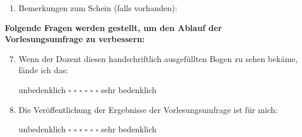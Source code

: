 \documentclass[10pt,a4paper]{article}
\begin{document}
\begin{enumerate}
	\underline{\hspace{15.9cm}}
	
	\underline{\hspace{15.9cm}}
	\vspace{0.1pt}
	
	\item Bemerkungen zum Schein (falls vorhanden):
	
	\underline{\hspace{15.9cm}}
	
	\underline{\hspace{15.9cm}}
	
	\underline{\hspace{15.9cm}}
	
\end{enumerate}

\textbf{Folgende Fragen werden gestellt, um den Ablauf der Vorlesungsumfrage zu verbessern:}
	\begin{enumerate}
		\setcounter{enumi}{6}
		\item Wenn der Dozent diesen handschriftlich ausgefüllten Bogen zu sehen bekäme, fände ich das:
		\vspace{-1pt}
		\begin{center}
			unbedenklich \hspace{0.2cm} $\square$ \hspace{1cm} $\square$ \hspace{1cm} $\square$ \hspace{1cm} $\square$ \hspace{1cm} $\square$ \hspace{1cm} $\square$ \hspace{0.2cm} sehr bedenklich
		\end{center}

		\item Die Veröffentlichung der Ergebnisse der Vorlesungsumfrage ist für mich:
		\vspace{-1pt}
		\begin{center}
			unbedenklich \hspace{0.2cm} $\square$ \hspace{1cm} $\square$ \hspace{1cm} $\square$ \hspace{1cm} $\square$ \hspace{1cm} $\square$ \hspace{1cm} $\square$ \hspace{0.2cm} sehr bedenklich
		\end{center}

	\end{enumerate}
\end{document}
